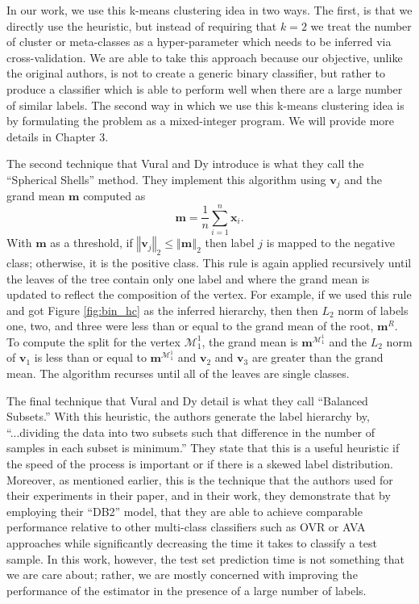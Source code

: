 \documentclass[../thesis.tex]{subfiles}
\begin{document}
In our work, we use this k-means clustering idea in two ways. The first, is that
we directly use the heuristic, but instead of requiring that $k=2$ we treat the
number of cluster or meta-classes as a hyper-parameter which needs to be
inferred via cross-validation. We are able to take this approach because our
objective, unlike the original authors, is not to create a generic binary
classifier, but rather to produce a classifier which is able to perform well
when there are a large number of similar labels. The second way in which we use
this k-means clustering idea is by formulating the problem as a mixed-integer
program. We will provide more details in Chapter 3.

The second technique that Vural and Dy introduce is what they call the
``Spherical Shells'' method. They implement this algorithm using $\mathbf{v}_j$
and the grand mean $\mathbf{m}$ computed as
\begin{equation}
    \mathbf{m} = \frac{1}{n}\sum_{i=1}^n \mathbf{x}_i.
\end{equation}
With $\mathbf{m}$ as a threshold, if $\left \Vert \mathbf{v}_j \right \Vert_2
\leq \left \Vert \mathbf{m} \right \Vert_2$ then label $j$ is mapped to the
negative class; otherwise, it is the positive class. This rule is again applied
recursively until the leaves of the tree contain only one label and where the
grand mean is updated to reflect the composition of the vertex. For example, if
we used this rule and got Figure \ref{fig:bin_hc} as the inferred hierarchy,
then then $L_2$ norm of labels one, two, and three were less than or equal to
the grand mean of the root, $\mathbf{m}^R$. To compute the split for the vertex
$\mathcal{M}_1^1$, the grand mean is $\mathbf{m}^{\mathcal{M}_1^1}$ and the
$L_2$ norm of $\mathbf{v}_1$ is less than or equal to
$\mathbf{m}^{\mathcal{M}_1^1}$ and $\mathbf{v}_2$ and $\mathbf{v}_3$ are greater
than the grand mean. The algorithm recurses until all of the leaves are single
classes.

The final technique that Vural and Dy detail is what they call ``Balanced
Subsets.'' With this heuristic, the authors generate the label hierarchy by,
``...dividing the data into two subsets such that difference in the number of
samples in each subset is minimum.'' They state that this is a useful heuristic
if the speed of the process is important or if there is a skewed label
distribution.  Moreover, as mentioned earlier, this is the technique that the
authors used for their experiments in their paper, and in their work, they
demonstrate that by employing their ``DB2'' model, that they are able to achieve
comparable performance relative to other multi-class classifiers such as OVR or
AVA approaches while significantly decreasing the time it takes to classify a
test sample. In this work, however, the test set prediction time is not
something that we are care about; rather, we are mostly concerned with improving
the performance of the estimator in the presence of a large number of labels.
\end{document}
